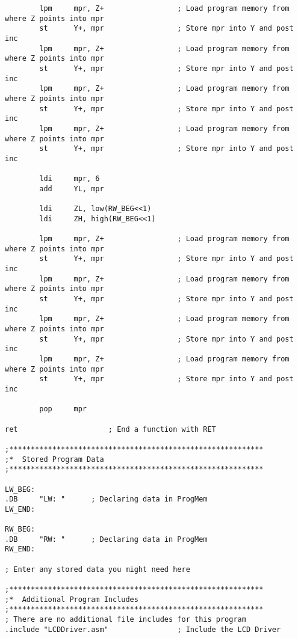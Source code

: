 \documentclass[12pt, letterpaper]{article}
\begin{document}
\begin{verbatim}
		lpm		mpr, Z+					; Load program memory from where Z points into mpr
		st		Y+, mpr					; Store mpr into Y and post inc
		lpm		mpr, Z+					; Load program memory from where Z points into mpr
		st		Y+, mpr					; Store mpr into Y and post inc
		lpm		mpr, Z+					; Load program memory from where Z points into mpr
		st		Y+, mpr					; Store mpr into Y and post inc
		lpm		mpr, Z+					; Load program memory from where Z points into mpr
		st		Y+, mpr					; Store mpr into Y and post inc

		ldi		mpr, 6
		add		YL, mpr

		ldi		ZL, low(RW_BEG<<1)
		ldi		ZH, high(RW_BEG<<1)

		lpm		mpr, Z+					; Load program memory from where Z points into mpr
		st		Y+, mpr					; Store mpr into Y and post inc
		lpm		mpr, Z+					; Load program memory from where Z points into mpr
		st		Y+, mpr					; Store mpr into Y and post inc
		lpm		mpr, Z+					; Load program memory from where Z points into mpr
		st		Y+, mpr					; Store mpr into Y and post inc
		lpm		mpr, Z+					; Load program memory from where Z points into mpr
		st		Y+, mpr					; Store mpr into Y and post inc

		pop		mpr

ret						; End a function with RET

;***********************************************************
;*	Stored Program Data
;***********************************************************

LW_BEG:
.DB		"LW: "		; Declaring data in ProgMem
LW_END:

RW_BEG:
.DB		"RW: "		; Declaring data in ProgMem
RW_END:

; Enter any stored data you might need here

;***********************************************************
;*	Additional Program Includes
;***********************************************************
; There are no additional file includes for this program
.include "LCDDriver.asm"				; Include the LCD Driver



\end{verbatim}
\end{document}
